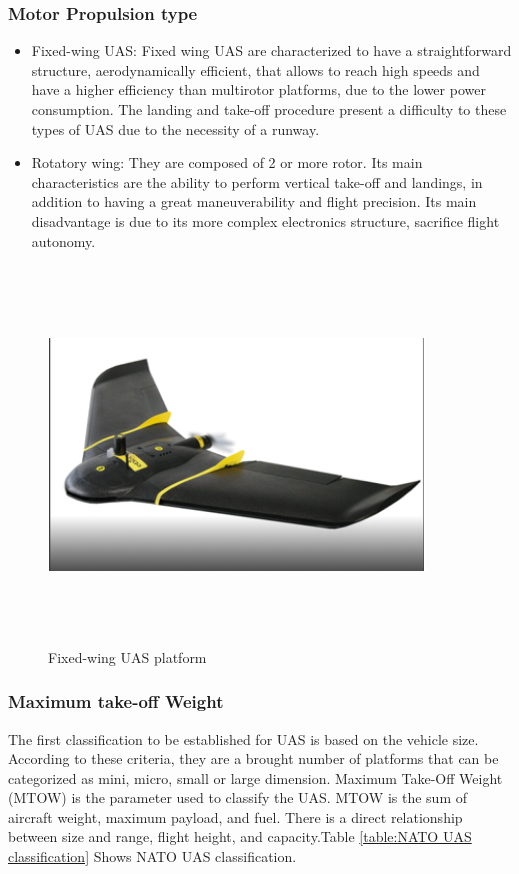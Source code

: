 \subsubsection{Motor Propulsion type}
\begin{itemize}
\item Fixed-wing UAS: Fixed wing UAS are characterized to have a straightforward structure, aerodynamically efficient, that allows to reach high speeds and have a higher efficiency than multirotor platforms, due to the lower power consumption. The landing and take-off procedure present a difficulty to these types of UAS due to the necessity of a runway.
\item Rotatory wing: They are composed of 2 or more rotor. Its main characteristics are the ability to perform vertical take-off and landings, in addition to having a great maneuverability and flight precision. Its main disadvantage is due to its more complex electronics structure, sacrifice flight autonomy.\cite{Luis_Fernadno}
\end{itemize}
\begin{figure}[H]
\centering
\includegraphics[width=10cm,height=10cm,keepaspectratio]{imagenes/eBee.PNG}
\caption{Fixed-wing UAS platform}
\label{fig:fixed-wing_UAS}
\end{figure}

\subsubsection{Maximum take-off Weight}
The first classification to be established for UAS is based on the vehicle size. According to these criteria, they are a brought number of platforms that can be categorized as mini, micro, small or large dimension. Maximum Take-Off Weight (MTOW) is the parameter used to classify the UAS. MTOW is the sum of aircraft weight, maximum payload, and fuel. There is a direct relationship between size and range, flight height, and capacity.Table \ref{table:NATO UAS classification} Shows NATO UAS classification.

